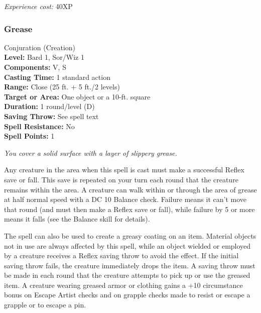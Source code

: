 \emph{Experience cost:} 40XP
\subsubsection{Grease}
\label{Spell:Grease}
Conjuration (Creation)
\\ \textbf{Level:} Bard 1, Sor/Wiz 1
\\ \textbf{Components:} V, S
\\ \textbf{Casting Time:} 1 standard action
\\ \textbf{Range:} Close (25 ft. + 5 ft./2 levels) 
\\ \textbf{Target or Area:} One object or a 10-ft. square
\\ \textbf{Duration:} 1 round/level (D)
\\ \textbf{Saving Throw:} See spell text
\\ \textbf{Spell Resistance:} No
\\ \textbf{Spell Points:} 1

\emph{You cover a solid surface with a layer of slippery grease.} 

Any creature in the area when this spell is cast must make a successful Reflex save or fall. 
This save is repeated on your turn each round that the creature remains within the area. 
A creature can walk within or through the area of grease at half normal speed with a DC 10 Balance check. 
Failure means it can't move that round (and must then make a Reflex save or fall), 
while failure by 5 or more means it falls (see the Balance skill for details).

The spell can also be used to create a greasy coating on an item. 
Material objects not in use are always affected by this spell, while an object wielded or employed by a creature receives a Reflex saving throw to avoid the effect. 
If the initial saving throw fails, the creature immediately drops the item. 
A saving throw must be made in each round that the creature attempts to pick up or use the greased item. 
A creature wearing greased armor or clothing gains a +10 circumstance bonus on Escape Artist checks and on grapple checks made to resist or escape a grapple or to escape a pin.

